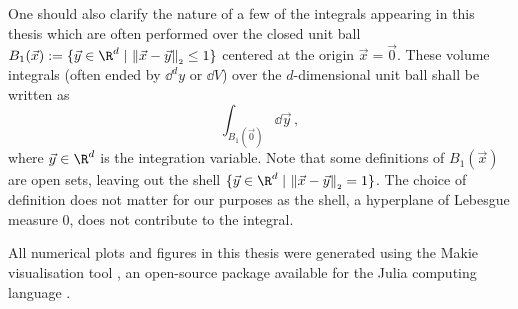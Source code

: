 One should also clarify the nature of a few of the integrals appearing in this thesis which are often performed over the closed unit ball $B_1(\vec{x}) := \{\vec{y} \in \R^d \;|\, \norm{\vec{x} - \vec{y}} \le 1\}$ centered at the origin $\vec{x} = \vec{0}$.
These volume integrals (often ended by $\dd^d y$ or $\dd V$) over the $d$-dimensional unit ball shall be written as
$$\int_{B_1(\vec{0})} \dd\vec{y}\,,$$
where $\vec{y} \in \R^d$ is the integration variable.
Note that some definitions of $B_1(\vec{x})$ are open sets, leaving out the shell $\{\vec{y} \in \R^d \;|\, \norm{\vec{x} - \vec{y}} = 1\}$.
The choice of definition does not matter for our purposes as the shell, a hyperplane of Lebesgue measure $0$, does not contribute to the integral.

All numerical plots and figures in this thesis were generated using the Makie visualisation tool \parencite{2021-makie}, an open-source package available for the Julia computing language \parencite{2017-julia}.
